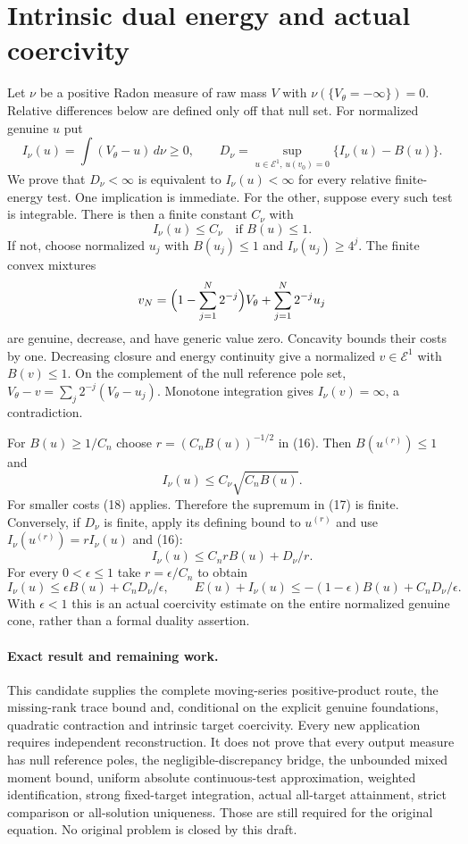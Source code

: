 \documentclass[10pt]{article}
\begin{document}
\section{Intrinsic dual energy and actual coercivity}
Let $\nu$ be a positive Radon measure of raw mass $V$ with
$\nu(\{V_\theta=-\infty\})=0$. Relative differences below are defined
only off that null set. For normalized genuine $u$ put
\[
 I_\nu(u)=\int(V_\theta-u)\,d\nu\geq0,
       \qquad D_\nu=\sup_{u\in\mathcal E^1,\,u(v_0)=0}
                       \{I_\nu(u)-B(u)\}.              \tag{17}
\]
We prove that $D_\nu<\infty$ is equivalent to $I_\nu(u)<\infty$
for every relative finite-energy test. One implication is immediate.
For the other, suppose every such test is integrable. There is then
a finite constant $C_\nu$ with
\[
             I_\nu(u)\leq C_\nu\quad\text{if }B(u)\leq1.          \tag{18}
\]
If not, choose normalized $u_j$ with $B(u_j)\leq1$ and
$I_\nu(u_j)\geq4^j$. The finite convex mixtures
\[
 v_N=\Bigl(1-\sum_{j=1}^N2^{-j}\Bigr)V_\theta
                         +\sum_{j=1}^N2^{-j}u_j
\]
are genuine, decrease, and have generic value zero. Concavity bounds
their costs by one. Decreasing closure and energy continuity give
a normalized $v\in\mathcal E^1$ with $B(v)\leq1$.
On the complement of the null reference pole set,
$V_\theta-v=\sum_j2^{-j}(V_\theta-u_j)$.
Monotone integration gives $I_\nu(v)=\infty$, a contradiction.

For $B(u)\geq1/C_n$ choose $r=(C_nB(u))^{-1/2}$ in (16).
Then $B(u^{(r)})\leq1$ and
\[
                 I_\nu(u)\leq C_\nu\sqrt{C_nB(u)}.      \tag{19}
\]
For smaller costs (18) applies. Therefore the supremum in (17) is
finite. Conversely, if $D_\nu$ is finite, apply its defining bound
to $u^{(r)}$ and use $I_\nu(u^{(r)})=rI_\nu(u)$ and (16):
\[
 I_\nu(u)\leq C_n rB(u)+D_\nu/r.
\]
For every $0<\epsilon\leq1$ take $r=\epsilon/C_n$ to obtain
\[
 I_\nu(u)\leq\epsilon B(u)+C_nD_\nu/\epsilon,
 \qquad E(u)+I_\nu(u)
       \leq-(1-\epsilon)B(u)+C_nD_\nu/\epsilon.           \tag{20}
\]
With $\epsilon<1$ this is an actual coercivity estimate on the entire
normalized genuine cone, rather than a formal duality assertion.

\paragraph{Exact result and remaining work.}
This candidate supplies the complete moving-series positive-product
route, the missing-rank trace bound and, conditional on the explicit
genuine foundations, quadratic contraction and intrinsic target
coercivity. Every new application requires independent reconstruction.
It does not prove that every output measure has null reference poles,
the negligible-discrepancy bridge, the unbounded mixed moment bound,
uniform absolute continuous-test approximation, weighted identification,
strong fixed-target integration, actual all-target attainment, strict
comparison or all-solution uniqueness. Those are still required for
the original equation. No original problem is closed by this draft.
\end{document}
